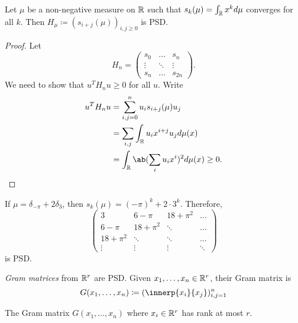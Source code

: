 \begin{proposition}
    Let $\mu$ be a non-negative measure on $\mathbb{R}$ such that
    $s_k(\mu) = \int_{\mathbb{R}} x^k d\mu$ converges for all $k$.
    Then $H_\mu \coloneq (s_{i+j}(\mu))_{i,j \ge 0}$
    is PSD.
\end{proposition}
\begin{proof}
    Let \[
        H_n = \begin{pmatrix}
            s_0 & \dots & s_n \\
            \vdots & \ddots & \vdots \\
            s_n & \dots & s_{2n}
        \end{pmatrix}.
    \] We need to show that $u^T H_n u \ge 0$ for all $u$.
    Write \begin{align*}
        u^T H_n u &= \sum_{i,j=0}^n u_i s_{i+j}(\mu) u_j \\
            &= \sum_{i,j} \int_\R u_i x^{i+j} u_j d\mu(x) \\
            &= \int_\R \ab(\sum_i u_i x^i)^2 d\mu(x) \ge 0. \qedhere
    \end{align*}
\end{proof}
\begin{examples}
    \item If $\mu = \delta_{-\pi} + 2 \delta_3$, then
        $s_k(\mu) = (-\pi)^k + 2 \cdot 3^k$.
        Therefore, \[
            \begin{pmatrix}
                3 & 6 - \pi & 18 + \pi^2 & \dots \\
                6 - \pi & 18 + \pi^2 & \ddots & \dots \\
                18 + \pi^2 & \ddots & \ddots & \dots \\
                \vdots & \vdots & \vdots & \ddots
            \end{pmatrix}
        \] is PSD.
    \item \emph{Gram matrices} from $\mathbb{R}^r$ are PSD.
        Given $x_1, \dots, x_n \in \mathbb{R}^r$, their Gram matrix is \[
            G(x_1, \dots, x_n) \coloneq (\innerp{x_i}{x_j})_{i,j=1}^n
        \]
\end{examples}
\begin{proposition} \label{thm:gram-rank}
    The Gram matrix $G(x_1, \dots, x_n)$ where $x_i \in \mathbb{R}^r$ has rank at
    most $r$.
\end{proposition}
